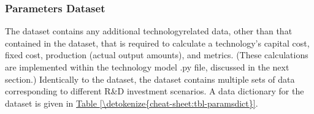 \documentclass[letterpaper,10pt,english]{sphinxmanual}
\begin{document}
\subsubsection{Parameters Dataset}
\label{\detokenize{cheat-sheet:parameters-dataset}}
\sphinxAtStartPar
The  dataset contains any additional technology\sphinxhyphen{}related data, other than that contained in the  dataset, that is required to calculate a technology’s capital cost, fixed cost, production (actual output amounts), and metrics. (These calculations are implemented within the technology model .py file, discussed in the next section.) Identically to the  dataset, the  dataset contains multiple sets of data corresponding to different R\&D investment scenarios. A data dictionary for the  dataset is given in \hyperref[\detokenize{cheat-sheet:tbl-paramsdict}]{Table \ref{\detokenize{cheat-sheet:tbl-paramsdict}}}.
\end{document}
